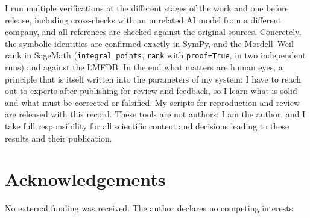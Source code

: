 \documentclass[11pt]{article}
\theoremstyle{remark}
\begin{document}
I run multiple verifications at the different stages of the work and one before release, including cross-checks with an unrelated AI model from a different company, and all references are checked against the original sources. Concretely, the symbolic identities are confirmed exactly in SymPy, and the Mordell--Weil rank in SageMath (\texttt{integral\_points}, \texttt{rank} with \texttt{proof=True}, in two independent runs) and against the LMFDB\@. In the end what matters are human eyes, a principle that is itself written into the parameters of my system: I have to reach out to experts after publishing for review and feedback, so I learn what is solid and what must be corrected or falsified. My scripts for reproduction and review are released with this record. These tools are not authors; I am the author, and I take full responsibility for all scientific content and decisions leading to these results and their publication.

\section*{Acknowledgements}
No external funding was received. The author declares no competing interests.
\end{document}
